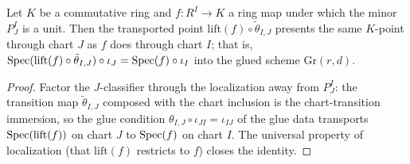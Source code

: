 \begin{lemma}\label{mk-lem:gr_chart_point_eq}
  \leanok

  Let \(K\) be a commutative ring and \(f : R^I \to K\) a ring map under which the minor
  \(P^I_J\) is a unit. Then the transported point
  \(\mathrm{lift}(f)\circ\tilde\theta_{I,J}\) presents the same \(K\)-point through chart
  \(J\) as \(f\) does through chart \(I\); that is,
  \(\operatorname{Spec}(\mathrm{lift}(f)\circ\tilde\theta_{I,J})\circ\iota_J = \operatorname{Spec}(f)\circ\iota_I\) into
  the glued scheme \(\mathrm{Gr}(r,d)\).
\end{lemma}
\begin{proof}

  Factor the \(J\)-classifier through the localization away from \(P^I_J\): the transition map
  \(\tilde\theta_{I,J}\) composed with the chart inclusion is the chart-transition immersion,
  so the glue condition \(\theta_{I,J}\circ\iota_{JI} = \iota_{IJ}\) of the glue data
  transports \(\operatorname{Spec}(\mathrm{lift}(f))\) on chart \(J\) to \(\operatorname{Spec}(f)\) on chart \(I\). The
  universal property of localization (that \(\mathrm{lift}(f)\) restricts to \(f\)) closes the
  identity.
\end{proof}

